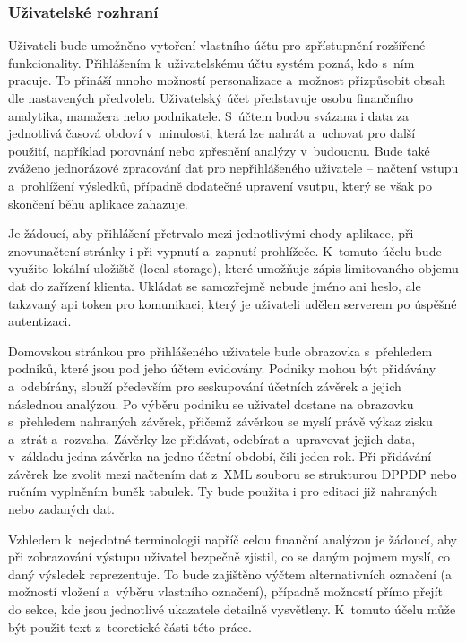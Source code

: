 \pagebreak
\subsubsection{Uživatelské rozhraní}


Uživateli bude umožněno vytoření vlastního účtu pro zpřístupnění rozšířené funkcionality. Přihlášením k~uživatelskému účtu systém pozná, kdo s~ním pracuje. To přináší mnoho možností personalizace a~možnost přizpůsobit obsah dle nastavených předvoleb. Uživatelský účet představuje osobu finančního analytika, manažera nebo podnikatele. S~účtem budou svázana i data za jednotlivá časová obdoví v~minulosti, která lze nahrát a~uchovat pro další použití, například porovnání nebo zpřesnění analýzy v~budoucnu. Bude také zváženo jednorázové zpracování dat pro nepřihlášeného uživatele -- načtení vstupu a~prohlížení výsledků, případně dodatečné upravení vsutpu, který se však po skončení běhu aplikace zahazuje.

Je žádoucí, aby přihlášení přetrvalo mezi jednotlivými chody aplikace, při znovunačtení stránky i při vypnutí a~zapnutí prohlížeče. K~tomuto účelu bude využito lokální uložiště (local storage), které umožňuje zápis limitovaného objemu dat do zařízení klienta. Ukládat se samozřejmě nebude jméno ani heslo, ale takzvaný api token pro komunikaci, který je uživateli udělen serverem po úspěšné autentizaci.

Domovskou stránkou pro přihlášeného uživatele bude obrazovka s~přehledem podniků, které jsou pod jeho účtem evidovány. Podniky mohou být přidávány a~odebírány, slouží především pro seskupování účetních závěrek a jejich následnou analýzou. Po výběru podniku se uživatel dostane na obrazovku s~přehledem nahraných závěrek, přičemž závěrkou se myslí právě výkaz zisku a~ztrát a~rozvaha. Závěrky lze přidávat, odebírat a~upravovat jejich data, v~základu jedna závěrka na jedno účetní období, čili jeden rok. Při přidávání závěrek lze zvolit mezi načtením dat z~XML souboru se strukturou DPPDP nebo ručním vyplněním buněk tabulek. Ty bude použita i pro editaci již nahraných nebo zadaných dat.  

Vzhledem k~nejedotné terminologii napříč celou finanční analýzou je žádoucí, aby při zobrazování výstupu uživatel bezpečně zjistil, co se daným pojmem myslí, co daný výsledek reprezentuje. To bude zajištěno výčtem alternativních označení (a možností vložení a~výběru vlastního označení), případně možností přímo přejít do sekce, kde jsou jednotlivé ukazatele detailně vysvětleny. K~tomuto účelu může být použit text z~teoretické části této práce.

